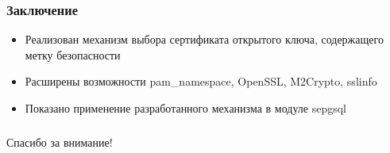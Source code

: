 \documentclass[xcolor={dvipsnames,table}]{beamer}
\begin{document}
\begin{frame}
 \frametitle{Заключение}
  

\begin{itemize}
  \item Реализован механизм выбора сертификата открытого ключа, содержащего метку безопасности
  \item Расширены возможности pam\_namespace, OpenSSL, M2Crypto, sslinfo
  \item Показано применение разработанного механизма в модуле sepgsql
\end{itemize}

  
\end{frame}
\begin{frame}
 \frametitle{}
  

\begin{center}
Спасибо за внимание!
\end{center}

  
\end{frame}
\end{document}
